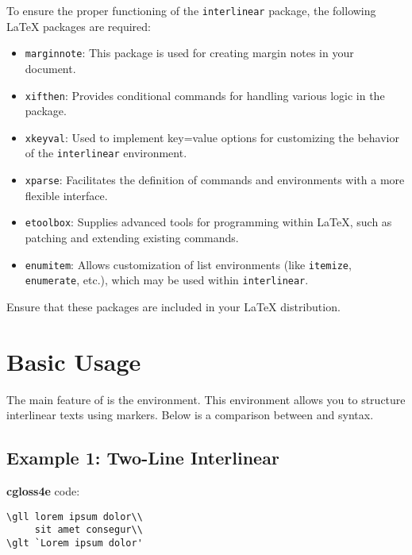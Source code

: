 \documentclass{article}
\begin{document}

To ensure the proper functioning of the \texttt{interlinear} package, the following LaTeX packages are required:

\begin{itemize}
    \item \texttt{marginnote}: This package is used for creating margin notes in your document.
    \item \texttt{xifthen}: Provides conditional commands for handling various logic in the package.
    \item \texttt{xkeyval}: Used to implement key=value options for customizing the behavior of the \texttt{interlinear} environment.
    \item \texttt{xparse}: Facilitates the definition of commands and environments with a more flexible interface.
    \item \texttt{etoolbox}: Supplies advanced tools for programming within LaTeX, such as patching and extending existing commands.
    \item \texttt{enumitem}: Allows customization of list environments (like \texttt{itemize}, \texttt{enumerate}, etc.), which may be used within \texttt{interlinear}.
\end{itemize}

Ensure that these packages are included in your LaTeX distribution.

\section{Basic Usage}
The main feature of  is the  environment. This environment allows you to structure interlinear texts using markers. Below is a comparison between  and  syntax.

\subsection{Example 1: Two-Line Interlinear}
\textbf{cgloss4e} code:
\begin{verbatim}
\gll lorem ipsum dolor\\
     sit amet consegur\\
\glt `Lorem ipsum dolor'
\end{verbatim}
\end{document}
